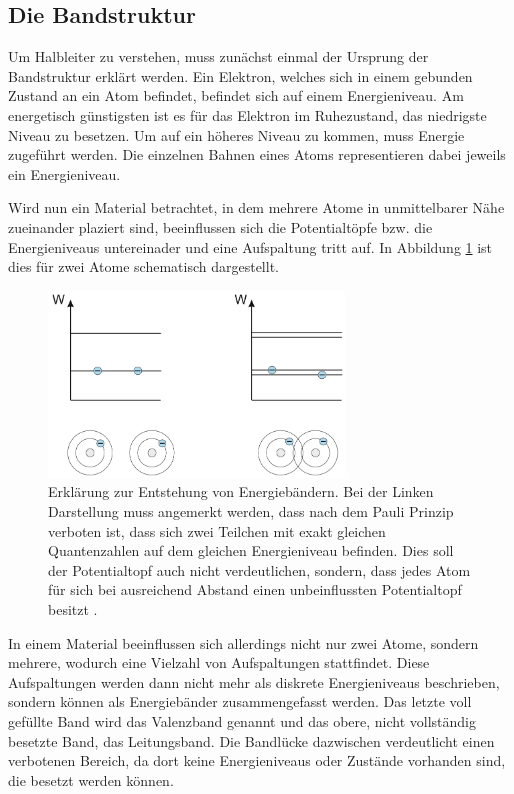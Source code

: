 \subsection{Die Bandstruktur}
\label{sec:bandstruktur}

Um Halbleiter zu verstehen, muss zunächst einmal der Ursprung der Bandstruktur 
erklärt werden. Ein Elektron, welches sich in einem gebunden Zustand an ein 
Atom befindet, befindet sich auf einem Energieniveau. Am energetisch günstigsten 
ist es für das Elektron im Ruhezustand, das niedrigste Niveau zu besetzen. Um auf 
ein höheres Niveau zu kommen, muss Energie zugeführt werden. Die einzelnen Bahnen 
eines Atoms representieren dabei jeweils ein Energieniveau. \par 

Wird nun ein Material betrachtet, in dem mehrere Atome in unmittelbarer 
Nähe zueinander plaziert sind, beeinflussen sich die Potentialtöpfe bzw. die 
Energieniveaus untereinader und eine Aufspaltung tritt auf. In Abbildung 
\ref{fig:bandstruktur} ist dies für zwei Atome schematisch dargestellt.


\begin{figure}
  \centering
  \includegraphics[width=0.7\textwidth]{content/graphics/bandstruktur.png}
  \caption{Erklärung zur Entstehung von Energiebändern. Bei der Linken Darstellung 
  muss angemerkt werden, dass nach dem Pauli Prinzip verboten ist, dass sich 
  zwei Teilchen mit exakt gleichen Quantenzahlen auf dem gleichen Energieniveau 
  befinden. Dies soll der Potentialtopf auch nicht verdeutlichen, sondern, dass 
  jedes Atom für sich bei ausreichend Abstand einen unbeinflussten 
  Potentialtopf besitzt \cite{BANDSTRUKTUR}.}
  \label{fig:bandstruktur}
\end{figure}

In einem Material beeinflussen sich allerdings nicht nur zwei Atome, sondern 
mehrere, wodurch eine Vielzahl von Aufspaltungen stattfindet. Diese 
Aufspaltungen werden dann nicht mehr als diskrete Energieniveaus beschrieben, 
sondern können als Energiebänder zusammengefasst werden. Das letzte voll 
gefüllte Band wird das Valenzband genannt und das obere, nicht vollständig 
besetzte Band, das Leitungsband. Die Bandlücke dazwischen verdeutlicht einen 
verbotenen Bereich, da dort keine Energieniveaus oder Zustände vorhanden sind, 
die besetzt werden können.